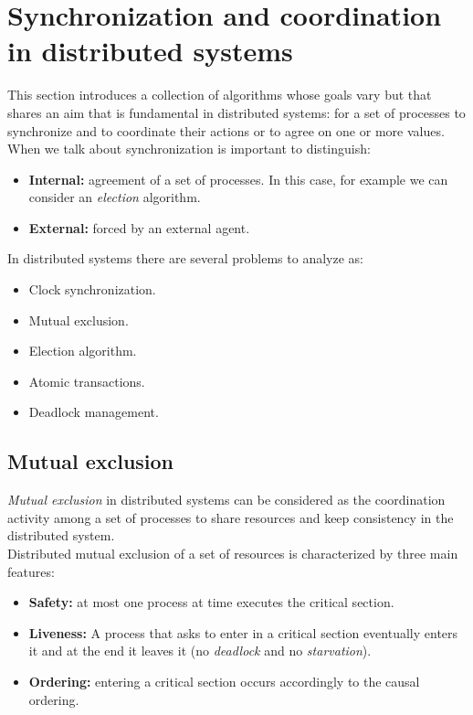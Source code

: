 \section{Synchronization and coordination in distributed systems}
This section introduces a collection of algorithms whose goals vary but that shares an aim that is fundamental in distributed systems: for a set of processes to synchronize and to coordinate their actions or to agree on one or more values.\\
When we talk about synchronization is important to distinguish:
\begin{itemize}
	\item \textbf{Internal:} agreement of a set of processes. In this case, for example we can consider an \textit{election} algorithm.
	\item \textbf{External:} forced by an external agent.
\end{itemize}
In distributed systems there are several problems to analyze as:
\begin{itemize}
	\item Clock synchronization.
	\item Mutual exclusion.
	\item Election algorithm.
	\item Atomic transactions.
	\item Deadlock management.
\end{itemize}

\subsection{Mutual exclusion}
\textit{Mutual exclusion} in distributed systems can be considered as the coordination activity among a set of processes to share resources and keep consistency in the distributed system.\\
Distributed mutual exclusion of a set of resources is characterized by three main features:
\begin{itemize}
	\item \textbf{Safety:} at most one process at time executes the critical section.
	\item \textbf{Liveness:} A process that asks to enter in a critical section eventually enters it and at the end it leaves it (no \textit{deadlock} and no \textit{starvation}).
	\item \textbf{Ordering:} entering a critical section occurs accordingly to the causal ordering.
\end{itemize}

